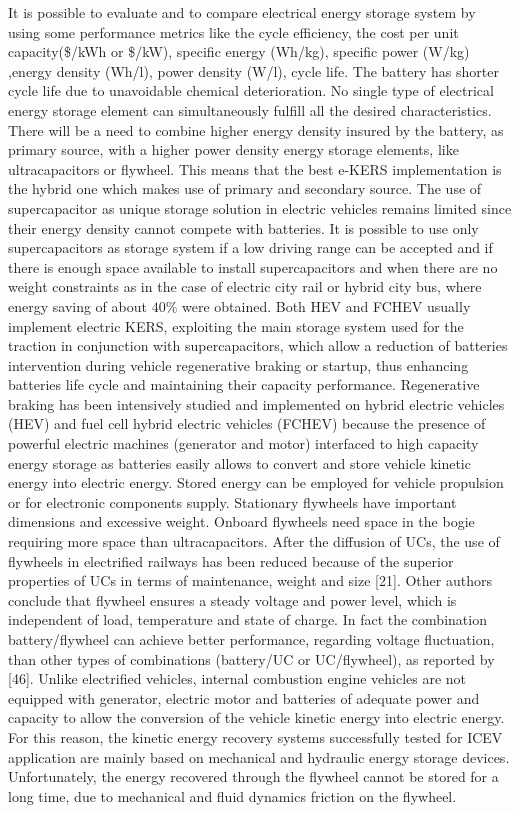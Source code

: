 \documentclass[11pt]{article}
\begin{document}
It is possible to evaluate and to compare electrical energy storage system by using some performance metrics like the cycle efficiency, the cost per unit capacity(\$/kWh or \$/kW), specific energy (Wh/kg), specific power (W/kg) ,energy density (Wh/l), power density (W/l), cycle life. The battery has shorter cycle life due to unavoidable chemical deterioration. No single type of electrical energy storage element can simultaneously fulfill all the desired characteristics. There will be a need to combine higher energy density insured by the battery, as primary source, with a higher power density energy storage elements, like ultracapacitors or flywheel. This means that the best e-KERS implementation is the hybrid one which makes use of primary and secondary source. The use of supercapacitor as unique storage solution in electric vehicles remains limited since their energy density cannot compete with batteries. It is possible to use only supercapacitors as storage system if a low driving range can be accepted and if there is enough space available to install supercapacitors and when there are no weight constraints as in the case of electric city rail or hybrid city bus, where energy saving of about $40\%$ were obtained. Both HEV  and FCHEV  usually implement electric KERS, exploiting the main storage system used for the traction in conjunction with supercapacitors, which allow a reduction of batteries intervention during vehicle regenerative braking or startup, thus enhancing batteries life cycle and maintaining their capacity performance. Regenerative braking has been intensively studied and implemented on hybrid electric vehicles (HEV) and fuel cell hybrid electric vehicles (FCHEV) because the presence of powerful electric machines (generator and motor) interfaced to high capacity energy storage as batteries easily allows to convert and store vehicle kinetic energy into electric energy. Stored energy can be employed for vehicle propulsion or for electronic components supply.  Stationary flywheels have important dimensions and excessive weight. Onboard flywheels need space in the bogie requiring more space than ultracapacitors. After the diffusion of UCs, the use of flywheels in electrified railways has been reduced because of the superior properties of UCs in terms of maintenance, weight and size [21]. Other authors conclude that flywheel ensures a steady voltage and power level, which is independent of load, temperature and state of charge. In fact the combination battery/flywheel can achieve better performance, regarding voltage fluctuation, than other types of combinations (battery/UC or UC/flywheel), as reported by [46]. Unlike electrified vehicles, internal combustion engine vehicles are not equipped with generator, electric motor and batteries of adequate power and capacity to allow the conversion of the vehicle kinetic energy into electric energy. For this reason, the kinetic energy recovery systems successfully tested for ICEV application are mainly based on mechanical and hydraulic energy storage devices. Unfortunately, the energy recovered through the flywheel cannot be stored for a long time, due to mechanical and fluid dynamics friction on the flywheel.
 
\end{document}
